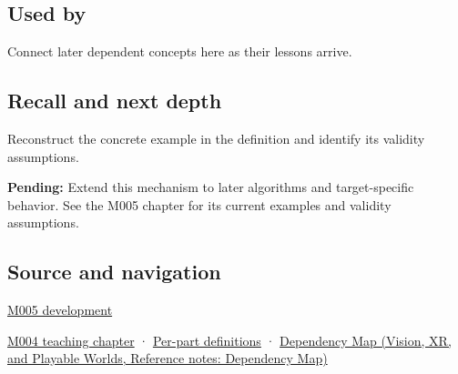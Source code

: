 \subsection{Used by}\label{appendix-ed8531b46754-used-by}

\hypertarget{appendix-ed8531b46754-used-by}{}

Connect later dependent concepts here as their lessons arrive.

\subsection{Recall and next depth}\label{appendix-ed8531b46754-recall-and-next-depth}

\hypertarget{appendix-ed8531b46754-recall-and-next-depth}{}

Reconstruct the concrete example in the definition and identify its validity assumptions.

\textbf{Pending:} Extend this mechanism to later algorithms and target-specific behavior. See the M005 chapter for its current examples and validity assumptions.

\subsection{Source and navigation}\label{appendix-ed8531b46754-source-and-navigation}

\hypertarget{appendix-ed8531b46754-source-and-navigation}{}

\hyperref[01-foundations-i-ch001-when-arithmetic-meets-uncertainty]{M005 development}

\hyperref[01-foundations-i-ch001-a-stretching-ruler-for-real-valued-quantities]{M004 teaching chapter} · \hyperref[appendix-fd090d982a15-m004---parts-61-76]{Per-part definitions} · \href{../07-Vision-XR-and-Playable-Worlds/main.pdf\#nameddest=appendix-4ad47bdd269a}{Dependency Map (Vision, XR, and Playable Worlds, Reference notes: Dependency Map)}
